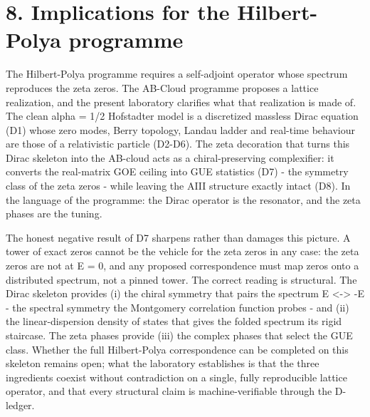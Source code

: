 \documentclass[11pt,a4paper]{article}
\begin{document}
\section{8. Implications for the Hilbert-Polya programme}
The Hilbert-Polya programme requires a self-adjoint operator whose spectrum reproduces the zeta zeros. The AB-Cloud programme proposes a lattice realization, and the present laboratory clarifies what that realization is made of. The clean alpha = 1/2 Hofstadter model is a discretized massless Dirac equation (D1) whose zero modes, Berry topology, Landau ladder and real-time behaviour are those of a relativistic particle (D2-D6). The zeta decoration that turns this Dirac skeleton into the AB-cloud acts as a chiral-preserving complexifier: it converts the real-matrix GOE ceiling into GUE statistics (D7) - the symmetry class of the zeta zeros - while leaving the AIII structure exactly intact (D8). In the language of the programme: the Dirac operator is the resonator, and the zeta phases are the tuning.

The honest negative result of D7 sharpens rather than damages this picture. A tower of exact zeros cannot be the vehicle for the zeta zeros in any case: the zeta zeros are not at E = 0, and any proposed correspondence must map zeros onto a distributed spectrum, not a pinned tower. The correct reading is structural. The Dirac skeleton provides (i) the chiral symmetry that pairs the spectrum E <-> -E - the spectral symmetry the Montgomery correlation function probes - and (ii) the linear-dispersion density of states that gives the folded spectrum its rigid staircase. The zeta phases provide (iii) the complex phases that select the GUE class. Whether the full Hilbert-Polya correspondence can be completed on this skeleton remains open; what the laboratory establishes is that the three ingredients coexist without contradiction on a single, fully reproducible lattice operator, and that every structural claim is machine-verifiable through the D-ledger.
\end{document}
